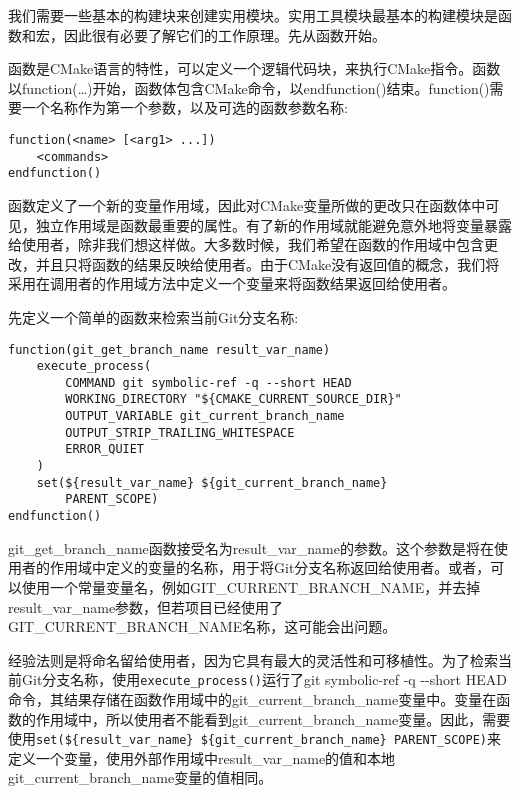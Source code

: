 
我们需要一些基本的构建块来创建实用模块。实用工具模块最基本的构建模块是函数和宏，因此很有必要了解它们的工作原理。先从函数开始。


函数是CMake语言的特性，可以定义一个逻辑代码块，来执行CMake指令。函数以function(…)开始，函数体包含CMake命令，以endfunction()结束。function()需要一个名称作为第一个参数，以及可选的函数参数名称:

\begin{lstlisting}[style=styleCMake]
function(<name> [<arg1> ...])
	<commands>
endfunction()
\end{lstlisting}

函数定义了一个新的变量作用域，因此对CMake变量所做的更改只在函数体中可见，独立作用域是函数最重要的属性。有了新的作用域就能避免意外地将变量暴露给使用者，除非我们想这样做。大多数时候，我们希望在函数的作用域中包含更改，并且只将函数的结果反映给使用者。由于CMake没有返回值的概念，我们将采用在调用者的作用域方法中定义一个变量来将函数结果返回给使用者。

先定义一个简单的函数来检索当前Git分支名称:

\begin{lstlisting}[style=styleCMake]
function(git_get_branch_name result_var_name)
	execute_process(
		COMMAND git symbolic-ref -q --short HEAD
		WORKING_DIRECTORY "${CMAKE_CURRENT_SOURCE_DIR}"
		OUTPUT_VARIABLE git_current_branch_name
		OUTPUT_STRIP_TRAILING_WHITESPACE
		ERROR_QUIET
	)
	set(${result_var_name} ${git_current_branch_name}
		PARENT_SCOPE)
endfunction()
\end{lstlisting}

git\_get\_branch\_name函数接受名为result\_var\_name的参数。这个参数是将在使用者的作用域中定义的变量的名称，用于将Git分支名称返回给使用者。或者，可以使用一个常量变量名，例如GIT\_CURRENT\_BRANCH\_NAME，并去掉result\_var\_name参数，但若项目已经使用了GIT\_CURRENT\_BRANCH\_NAME名称，这可能会出问题。

经验法则是将命名留给使用者，因为它具有最大的灵活性和可移植性。为了检索当前Git分支名称，使用\texttt{execute\_process()}运行了git symbolic-ref -q -{}-short HEAD命令，其结果存储在函数作用域中的git\_current\_branch\_name变量中。变量在函数的作用域中，所以使用者不能看到git\_current\_branch\_name变量。因此，需要使用\texttt{set(\$\{result\_var\_name\} \$\{git\_current\_branch\_name\} PARENT\_SCOPE)}来定义一个变量，使用外部作用域中result\_var\_name的值和本地git\_current\_branch\_name变量的值相同。

